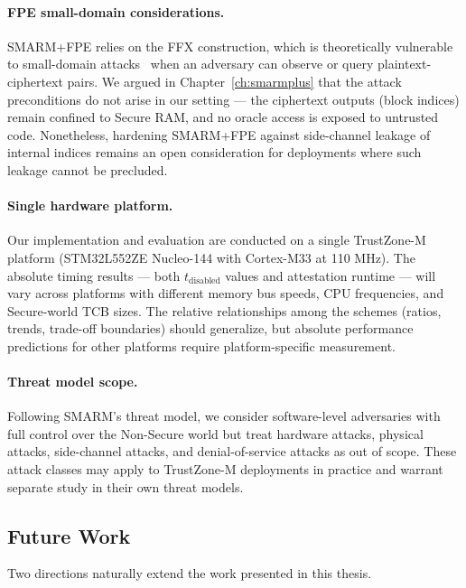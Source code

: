 \documentclass[a4paper,10pt]{article}
\begin{document}
{\paragraph{FPE small-domain considerations.}
SMARM+FPE relies on the FFX construction, which 
is theoretically vulnerable to small-domain 
attacks~\cite{hoang2018curse} when an adversary can observe or 
query plaintext-ciphertext pairs. We argued in 
Chapter~\ref{ch:smarmplus} that the attack preconditions do not 
arise in our setting — the ciphertext outputs (block indices) 
remain confined to Secure RAM, and no oracle access is exposed 
to untrusted code. Nonetheless, hardening 
SMARM+FPE against side-channel leakage of 
internal indices remains an open consideration for 
deployments where such leakage cannot be precluded.

\paragraph{Single hardware platform.}
Our implementation and evaluation are conducted on a single 
TrustZone-M platform (STM32L552ZE Nucleo-144 with Cortex-M33 at 
110 MHz). The absolute timing results — both 
$t_{\mathrm{disabled}}$ values and attestation runtime — will 
vary across platforms with different memory bus speeds, CPU 
frequencies, and Secure-world TCB sizes. The relative 
relationships among the schemes (ratios, trends, trade-off 
boundaries) should generalize, but absolute performance 
predictions for other platforms require platform-specific 
measurement.

\paragraph{Threat model scope.}
Following SMARM's threat model, we consider software-level 
adversaries with full control over the Non-Secure world but 
treat hardware attacks, physical attacks, side-channel attacks, 
and denial-of-service attacks as out of scope. These attack 
classes may apply to TrustZone-M deployments in practice and 
warrant separate study in their own threat models.

\subsection{Future Work}
\label{sec:future-work}

Two directions naturally extend the work presented in this 
thesis.

}
\end{document}
